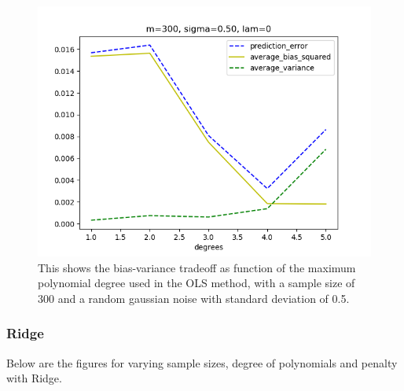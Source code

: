 \medskip

\FloatBarrier
\begin{figure}[!ht]
	\centering
	\FloatBarrier
	\includegraphics[width=1\textwidth]{plot_ols_without_r2/olsprediction_error_vs_degrees_m300_l300_s50.png}
	
	\caption{This shows the bias-variance tradeoff as function of the maximum polynomial degree used in the OLS method, with a sample size of 300 and a random gaussian noise with standard deviation of 0.5.}
	\label{fig:1}
\end{figure}
\FloatBarrier

\medskip

\subsubsection{Ridge}

Below are the figures for varying sample sizes, degree of polynomials and penalty with Ridge.

